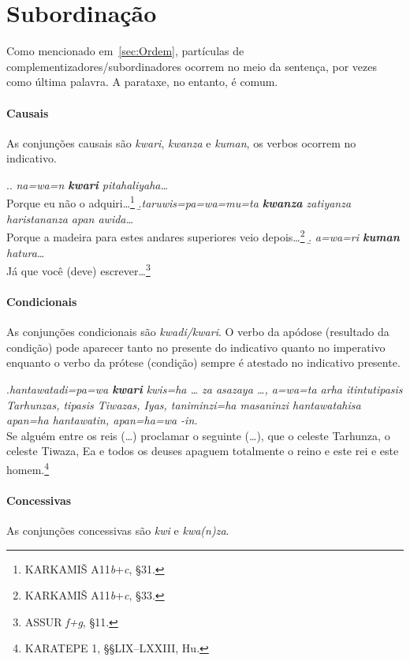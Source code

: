 \section{Subordinação}
Como mencionado em~\autoref{sec:Ordem}, partículas de
complementizadores\slash{}subor\-di\-na\-do\-res ocorrem no meio da sentença, por vezes
como última palavra.
A parataxe, no entanto, é comum.

\paragraph{Causais}
As conjunções causais são \emph{kwari}, \emph{kwanza} e \emph{kuman}, os verbos
ocorrem no indicativo.

\ex.\a. \emph{na=wa=n \textbf{kwari} pitahaliyaha\ldots{}}\\
Porque eu não o adquiri\ldots{}\footnote{KARKAMIŠ A11\emph{b}+\emph{c}, §31.}
\b.\emph{taruwis=pa=wa=mu=ta \textbf{kwanza} zatiyanza haristananza apan awida\ldots{}}\\
Porque a madeira para estes andares superiores veio
depois\ldots{}\footnote{KARKAMIŠ A11\emph{b}+\emph{c}, §33.}
\b. \emph{a=wa=ri \textbf{kuman} hatura\ldots{}}\\
Já que você (deve) escrever\ldots{}\footnote{ASSUR \emph{f+g}, §11.}



\paragraph{Condicionais}
As conjunções condicionais são \emph{kwadi\slash{}kwari}.
O verbo da apódose (resultado da condição) pode aparecer tanto no presente do
indicativo quanto no imperativo enquanto o verbo da prótese (condição) sempre é
atestado no indicativo presente.

\ex.\emph{hantawatadi=pa=wa \textbf{kwari} kwis=ha \ldots{} za asazaya \ldots{},
	a=wa=ta arha itintu\linebreak tipasis Tarhunzas, tipasis Tiwazas, Iyas,
	taniminzi=ha masaninzi hantawata\-hisa apan=ha hantawatin, apan=ha=wa
	-in.}\\
Se alguém entre os reis (\ldots{}) proclamar o seguinte (\ldots{}), que o celeste
Tarhun\-za,
o celeste Tiwaza, Ea e todos os deuses apaguem totalmente o reino e este rei e
este homem.\footnote{KARATEPE 1, §§LIX--LXXIII, Hu.}


\paragraph{Concessivas}
As conjunções concessivas são \emph{kwi} e \emph{kwa\emph{(}n\emph{)}za}.

